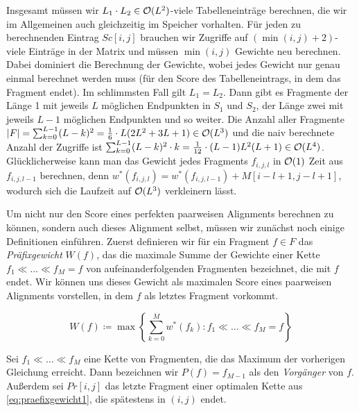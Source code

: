 \begin{beweis}
	Insgesamt müssen wir $L_1 \cdot L_2 \in \mathcal{O}(L^2)$-viele Tabelleneinträge berechnen, die wir im Allgemeinen auch gleichzeitig im Speicher vorhalten. Für jeden zu berechnenden Eintrag $Sc[i,j]$ brauchen wir Zugriffe auf $(\min(i,j) + 2)$-viele Einträge in der Matrix und müssen $\min(i,j)$ Gewichte neu berechnen. Dabei dominiert die Berechnung der Gewichte, wobei jedes Gewicht nur genau einmal berechnet werden muss (für den Score des Tabelleneintrags, in dem das Fragment endet). Im schlimmsten Fall gilt $L_1 = L_2$. Dann gibt es Fragmente der Länge 1 mit jeweils $L$ möglichen Endpunkten in $S_1$ und $S_2$, der Länge zwei mit jeweils $L-1$ möglichen Endpunkten und so weiter. Die Anzahl aller Fragmente $|F| = \sum_{k=0}^{L-1}(L-k)^2 = \frac{1}{6} \cdot L(2L^2+3L+1) \in \mathcal{O}(L^3)$ und die naiv berechnete Anzahl der Zugriffe ist $\sum_{k=0}^{L-1}(L-k)^2\cdot k = \frac{1}{12} \cdot (L-1)L^2(L+1) \in \mathcal{O}(L^4)$. Glücklicherweise kann man das Gewicht jedes Fragments $f_{i,j,l}$ in $\mathcal{O}(1)$ Zeit aus $f_{i,j,l-1}$ berechnen, denn $w^*(f_{i,j,l}) = w^*(f_{i,j,l-1}) + M[i\!-\!l\!+\!1, j\!-\!l\!+\!1]$, wodurch sich die Laufzeit auf $\mathcal{O}(L^3)$ verkleinern lässt.
\end{beweis}

Um nicht nur den Score eines perfekten paarweisen Alignments berechnen zu können, sondern auch dieses Alignment selbst, müssen wir zunächst noch einige Definitionen einführen. Zuerst definieren wir für ein Fragment $f \in F$ das \emph{Präfixgewicht} $W(f)$, das die maximale Summe der Gewichte einer Kette $f_1 \ll \dots \ll f_M=f$ von aufeinanderfolgenden Fragmenten bezeichnet, die mit $f$ endet. Wir können uns dieses Gewicht als maximalen Score eines paarweisen Alignments vorstellen, in dem $f$ als letztes Fragment vorkommt.

\begin{equation}\label{eq:praefixgewicht1}
	W(f) \coloneqq \max \left\{ \sum_{k=0}^{M} w^*(f_k) : f_1 \ll \dots \ll f_M=f \right\}
\end{equation}

\begin{definition}
	Sei $f_1 \ll \dots \ll f_M$ eine Kette von Fragmenten, die das Maximum der vorherigen Gleichung erreicht. Dann bezeichnen wir $P(f) = f_{M-1}$ als den \emph{Vorgänger} von $f$. Außerdem sei $Pr[i,j]$ das letzte Fragment einer optimalen Kette aus \eqref{eq:praefixgewicht1}, die spätestens in $(i,j)$ endet. 
\end{definition}


